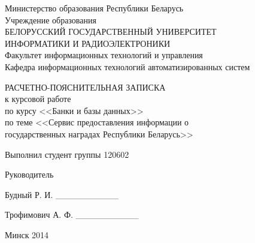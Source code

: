 \begin{titlepage}
\thispagestyle{empty}
\setlength{\parindent}{0ex} %

\begin{center}
  Министерство образования Республики Беларусь \\
  \smallskip
  Учреждение образования \\
  БЕЛОРУССКИЙ ГОСУДАРСТВЕННЫЙ УНИВЕРСИТЕТ \\
  ИНФОРМАТИКИ И РАДИОЭЛЕКТРОНИКИ \\
  \smallskip
  Факультет информационных технологий и управления \\
  \smallskip
  Кафедра информационных технологий автоматизированных систем
\end{center}

\vspace{40mm}

\begin{center}
  РАСЧЕТНО-ПОЯСНИТЕЛЬНАЯ ЗАПИСКА \\
  к курсовой работе \\
  по курсу <<Банки и базы данных>> \\
  по теме <<Сервис предоставления информации о \\ государственных наградах Республики Беларусь>> \\
\end{center}

\vspace{30mm}

\begin{minipage}{.45\linewidth}
    Выполнил студент группы 120602 

    \smallskip

    Руководитель 
\end{minipage}
\hfill
\begin{minipage}{.5\linewidth}
  \begin{flushright}
    Будный Р. И. \_\_\_\_\_\_\_\_\_\_

    \smallskip

    Трофимович А. Ф. \_\_\_\_\_\_\_\_\_\_
  \end{flushright}
\end{minipage}

\vspace{70mm}
\begin{center}
  Минск 2014
\end{center}

\setlength{\parindent}{5ex} %
\end{titlepage}